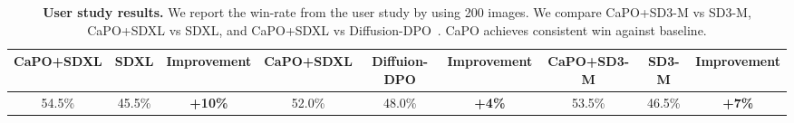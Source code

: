 \begin{table}[t]
\centering\small
\setlength\tabcolsep{2pt} 
\begin{tabular}{ ccc | ccc | ccc }
\toprule
 CaPO+SDXL & SDXL & Improvement & CaPO+SDXL & Diffuion-DPO & Improvement & CaPO+SD3-M & SD3-M & Improvement\\
\midrule
{ 54.5\%} & 45.5\% & {\bf +10\%} & 52.0\% & 48.0\% & {\bf +4\%} & { 53.5\%} & 46.5\% & {\bf +7\%}\\
\bottomrule
\end{tabular}
\caption{
\textbf{User study results.} We report the win-rate from the user study by using 200 images. We compare CaPO+SD3-M vs SD3-M, CaPO+SDXL vs SDXL, and CaPO+SDXL vs Diffusion-DPO~\citep{wallace2023diffusion}.
CaPO achieves consistent win against baseline. 
}\label{tab:user}
\end{table}